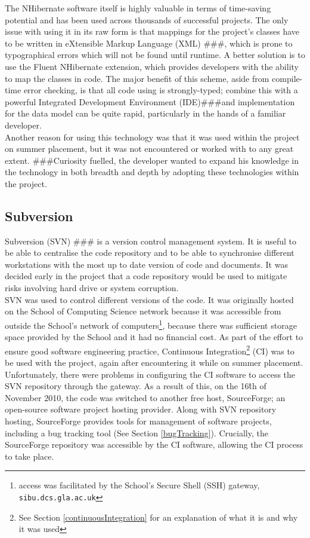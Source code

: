\documentclass{l4proj}
\newcommand{\revisit}{\#\#\#}
\begin{document}
The NHibernate software itself is highly valuable in terms of time-saving potential and has been used across thousands of successful projects\cite{NhUse}.  The only issue with using it in its raw form is that mappings for the project's classes have to be written in eXtensible Markup Language (XML) \revisit, which is prone to typographical errors which will not be found until runtime.  A better solution is to use the Fluent NHibernate extension, which provides developers with the ability to map the classes in code.  The major benefit of this scheme, aside from compile-time error checking, is that all code using is strongly-typed; combine this with a powerful Integrated Development Environment (IDE)\revisit and implementation for the data model can be quite rapid, particularly in the hands of a familiar developer.\\

Another reason for using this technology was that it was used within the project on summer placement, but it was not encountered or worked with to any great extent.  \revisit Curiosity fuelled, the developer wanted to expand his knowledge in the technology in both breadth and depth by adopting these technologies within the project.

\subsection{Subversion}
Subversion (SVN) \revisit{} is a version control management system.  It is useful to be able to centralise the code repository and to be able to synchronise different workstations with the most up to date version of code and documents.  It was decided early in the project that a code repository would be used to mitigate risks involving hard drive or system corruption.  \\

SVN was used to control different versions of the code.  It was originally hosted on the School of Computing Science network because it was accessible from outside the School's network of computers\footnote{access was facilitated by the School's Secure Shell (SSH) gateway, \texttt{sibu.dcs.gla.ac.uk}}, because there was sufficient storage space provided by the School and it had no financial cost.  As part of the effort to ensure good software engineering practice, Continuous Integration\footnote{See Section \ref{continuousIntegration} for an explanation of what it is and why it was used} (CI) was to be used with the project, again after encountering it while on summer placement.  Unfortunately, there were problems in configuring the CI software to access the SVN repository through the gateway.  As a result of this, on the 16\^{th} of November 2010, the code was switched to another free host, SourceForge; an open-source software project hosting provider.  Along with SVN repository hosting, SourceForge provides tools for management of software projects, including a bug tracking tool (See Section \ref{bugTracking}).  Crucially, the SourceForge repository was accessible by the CI software, allowing the CI process to take place.\\
\end{document}
